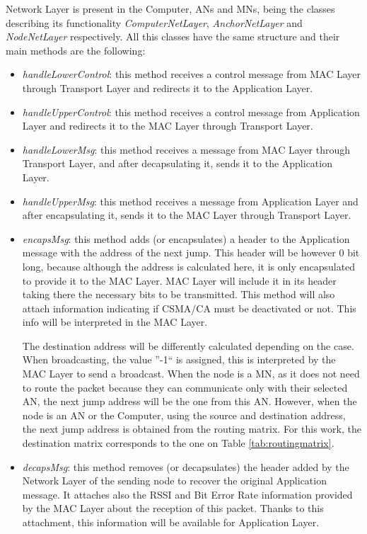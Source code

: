 Network Layer is present in the Computer, \acp{AN} and \acp{MN}, being the classes describing its functionality \textit{ComputerNetLayer},
\textit{AnchorNetLayer} and \textit{NodeNetLayer} respectively. All this classes have the same structure and their main methods are the following:
\begin{itemize}
 \item \textit{handleLowerControl}: this method receives a control message from \ac{MAC} Layer through Transport Layer and redirects it to the
Application Layer.
 \item \textit{handleUpperControl}: this method receives a control message from Application Layer and redirects it to the \ac{MAC} Layer through
Transport Layer.
 \item \textit{handleLowerMsg}: this method receives a message from \ac{MAC} Layer through Transport Layer, and after decapsulating it, sends it
to the Application Layer.
 \item \textit{handleUpperMsg}: this method receives a message from Application Layer and after encapsulating it, sends it to the \ac{MAC}
Layer through Transport Layer.
 \item \textit{encapsMsg}: this method adds (or encapsulates) a header to the Application message with the address of the next jump. This 
header will be however 0 bit long, because although the address is calculated here, it is only encapsulated to provide it to the \ac{MAC} Layer.
\ac{MAC} Layer will include it in its header taking there the necessary bits to be transmitted. This method will also attach information 
indicating if \ac{CSMA/CA} must be deactivated or not. This info will be interpreted in the \ac{MAC} Layer.

The destination address will be differently calculated depending on the case. When broadcasting, the value ''-1`` is assigned, this is 
interpreted by the \ac{MAC} Layer to send a broadcast. When the node is a \ac{MN}, as it does not need to route the packet because they 
can communicate only with their selected \ac{AN}, the next jump address will be the one from this \ac{AN}. However, when the node is an \ac{AN}
or the Computer, using the source and destination address, the next jump address is obtained from the routing matrix. For this work, the 
destination matrix corresponds to the one on Table \ref{tab:routingmatrix}.
 \item \textit{decapsMsg}: this method removes (or decapsulates) the header added by the Network Layer of the sending node to recover the 
original Application message. It attaches also the \ac{RSSI} and Bit Error Rate information provided by the \ac{MAC} Layer about the 
reception of this packet. Thanks to this attachment, this information will be available for Application Layer.
\end{itemize}

